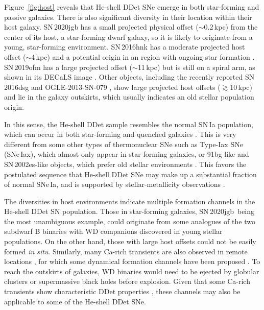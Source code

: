 \documentclass[twocolumn]{aastex631}
\newcommand{\sn}{SN\,2020jgb}
\begin{document}
Figure~\ref{fig:host} reveals that He-shell DDet SNe emerge in both star-forming and passive galaxies. There is also significant diversity in their location within their host galaxy. SN\,2020jgb has a small projected physical offset ($\sim$0.2\,kpc) from the center of its host, a star-forming dwarf galaxy, so it is likely to originate from a young, star-forming environment. SN\,2016hnk has a moderate projected host offset ($\sim$4\,kpc) and a potential origin in an  region with ongoing star formation \citep{galbany_16hnk_2019}. SN\,2019ofm has a large projected offset ($\sim$11\,kpc) but is still on a spiral arm, as shown in its DECaLS image \citep{Dey_2019}. Other objects, including the recently reported SN\,2016dsg and OGLE-2013-SN-079 \citep{Dong_16dsg_2022}, show large projected host offsets ($\gtrsim$10\,kpc) and lie in the galaxy outskirts, which usually indicates an old stellar population origin.

In this sense, the He-shell DDet sample resembles the normal SN\,Ia population, which can occur in both star-forming and quenched galaxies \citep[e.g.,][]{Sullivan_2006, Smith_2012}. This is very different from some other types of thermonuclear SNe such as Type-Iax SNe (SNe\,Iax), which almost only appear in star-forming galaxies, or 91bg-like and SN\,2002es-like \citep[02es-like;][]{Ganeshalingam_2012} objects, which prefer old stellar environments \citep[see the review by][]{Jha_2019}. This favors the postulated sequence that He-shell DDet SNe may make up a substantial fraction of normal SNe\,Ia, and is supported by stellar-metallicity observations \citep{Sanders_2021, Eitner_2022}.

The diversities in host environments indicate multiple formation channels in the He-shell DDet SN population. Those in star-forming galaxies, \sn\ being the most unambiguous example, could originate from some analogues of the two subdwarf B binaries with WD companions \citep{Iben_1987,Geier_2013, Kupfer_2022} discovered in young stellar populations.
On the other hand, those with large host offsets could not be easily formed {\it in situ}. Similarly, many Ca-rich transients are also observed in remote locations \citep[e.g.,][]{Lunnan_2017}, for which some dynamical formation channels have been proposed \citep{Lyman_2014}. To reach the outskirts of galaxies, WD binaries would need to be ejected by globular clusters \citep{Shen_2019} or supermassive black holes \citep{Foley_2015} before explosion. Given that some Ca-rich transients show characteristic DDet properties \citep{de_Ca_rich_2020}, these channels may also be applicable to some of the He-shell DDet SNe. 
\end{document}
